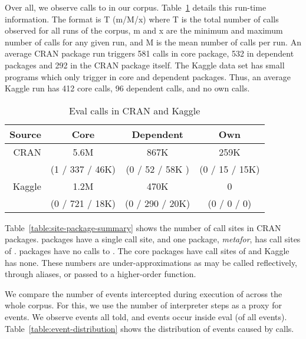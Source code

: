 \documentclass[USenglish,cleveref, autoref, thm-restate]{lipics-v2019}
\begin{document}
Over all, we observe \AllAllCallCountRnd calls to \eval in our corpus.
Table~\ref{A} details this run-time information. The format is T (m/M/x)
where T is the total number of calls observed for all runs of the corpus, m
and x are the minimum and maximum number of calls for any given run, and M
is the mean number of calls per run. An average CRAN package run triggers
581 {\eval} calls in core package, 532 in dependent packages and 292 in the
CRAN package itself.  The Kaggle data set has small programs which only
trigger \eval in core and dependent packages. Thus, an average Kaggle run
has 412 core calls, 96 dependent calls, and no own calls.


\begin{table}[!h] \centering
 \begin{tabular}{r|c|c|c} \hline
Source & Core    & Dependent                      & Own \\\hline
CRAN   & 5.6M &  867K    & 259K \\
       & (1 / 337 / 46K)& (0 / 52 / 58K ) & (0 / 15 / 15K) \\\hline
Kaggle &  1.2M &  470K   & 0\\
 &  (0 / 721 / 18K) & (0 / 290 / 20K) & (0 / 0 / 0)\\\hline
\end{tabular}\caption{Eval calls in CRAN and Kaggle}\label{A}\end{table}


Table~\ref{table:site-package-summary} shows the number of call sites in
CRAN packages. \OneCallSitesEnrich{} packages have a single call site, and one
package, \emph{metafor}, has \MaxCallSitesEnrich{} call sites of
\eval. \NoCallSitesEnrich{} packages have no calls to \eval. The core packages
have \NbCoreEvalCallSites{} call sites of \eval and Kaggle has none. These
numbers are under-approximations as \eval may be called reflectively,
through aliases, or passed to a higher-order function.


\begin{table}[ht]
\caption{Distribution of callsites in CRAN}
\label{table:site-package-summary}
\end{table}

We compare the number of events intercepted during execution of \eval across
the whole corpus. For this, we use the number of interpreter steps as a
proxy for events. We observe \AllEventCountRnd events all told, and
\EvalEventCountRnd events occur inside eval (\EvalEventAllPerc of all
events). Table~\ref{table:event-distribution} shows the distribution of
events caused by \eval calls.
\end{document}
